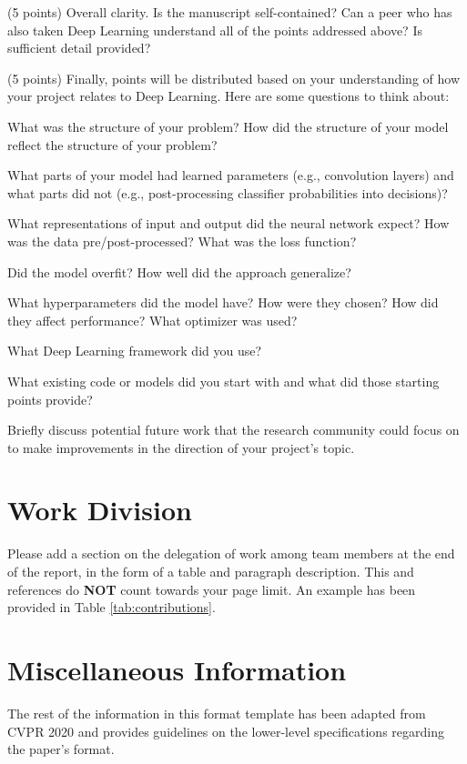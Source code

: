 \documentclass[10pt,twocolumn,letterpaper]{article}
\begin{document}
(5 points) Overall clarity. Is the manuscript self-contained? Can a peer who has also taken Deep Learning understand all of the points addressed above? Is sufficient detail provided? 

(5 points) Finally, points will be distributed based on your understanding of how your project relates to Deep Learning. Here are some questions to think about: 

What was the structure of your problem? How did the structure of your model reflect the structure of your problem? 

What parts of your model had learned parameters (e.g., convolution layers) and what parts did not (e.g., post-processing classifier probabilities into decisions)? 

What representations of input and output did the neural network expect? How was the data pre/post-processed?
What was the loss function? 

Did the model overfit? How well did the approach generalize? 

What hyperparameters did the model have? How were they chosen? How did they affect performance? What optimizer was used? 

What Deep Learning framework did you use? 

What existing code or models did you start with and what did those starting points provide? 

Briefly discuss potential future work that the research community could focus on to make improvements in the direction of your project's topic.



\section{Work Division}

Please add a section on the delegation of work among team members at the end of the report, in the form of a table and paragraph description. This and references do \textbf{NOT} count towards your page limit. An example has been provided in Table \ref{tab:contributions}.

\newpage
\newpage
\section{Miscellaneous Information}

The rest of the information in this format template has been adapted from CVPR 2020 and provides guidelines on the lower-level specifications regarding the paper's format.
\end{document}
